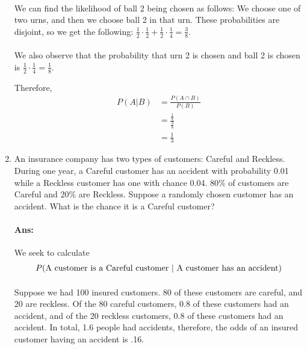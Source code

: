 \documentclass{article}
\begin{document}
\begin{enumerate}
    \paragraph{}We can find the likelihood of ball 2 being chosen as follows: We choose one of
two urns, and then we choose ball 2 in that urn. These probabilities are disjoint, so we get the following:
$\frac{1}{2}\cdot \frac{1}{2} + \frac{1}{2}\cdot \frac{1}{4} = \frac{3}{8}$. 
    \paragraph{}We also observe that the probability that urn 2 is chosen and ball 2 is chosen is
    $\frac{1}{2} \cdot \frac{1}{4} = \frac{1}{8}$.

    Therefore, 
    \begin{align*}
        P(A|B) &= \frac{P(A \cap B)}{P(B)}\\
               &= \frac{\frac{1}{8}}{\frac{3}{8}}\\
               &= \frac{1}{3}
    \end{align*}

    
    \item An insurance company has two types of customers: Careful and Reckless. During one
year, a Careful customer has an accident with probability 0.01 while a Reckless customer
has one with chance 0.04. 80\% of customers are Careful and 20\% are Reckless. Suppose a
randomly chosen customer has an accident. What is the chance it is a Careful customer?

    \paragraph{Ans: }We seek to calculate
    \begin{align*}
        P(\text{A customer is a Careful customer \textbar{} A customer has an accident})
    \end{align*}

    \paragraph{}Suppose we had 100 insured customers. 80 of these customers are careful, and 
    20 are reckless. Of the 80 careful customers, 0.8 of these customers had an accident, and of
    the 20 reckless customers, 0.8 of these customers had an accident. In total, 1.6 people had
    accidents, therefore, the odds of an insured customer having an accident is .16.


\end{enumerate}
\end{document}
